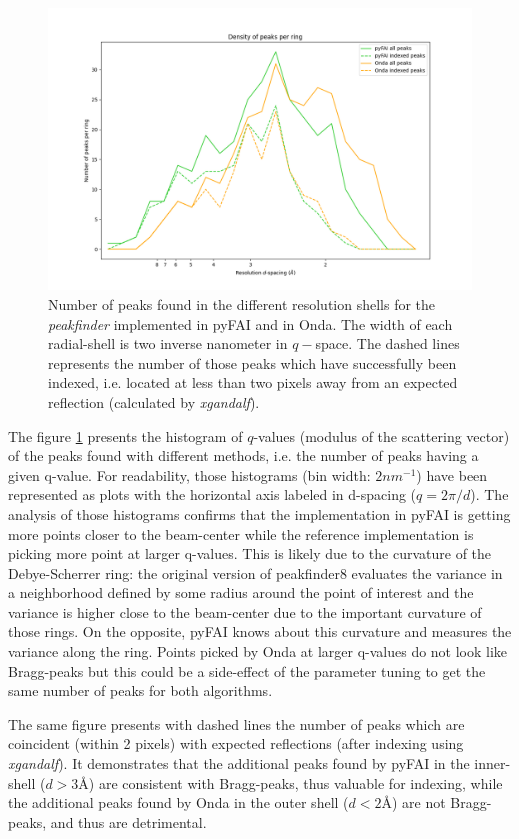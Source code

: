 \documentclass[preprint]{iucr}              %
\begin{document}
\begin{figure}
\label{peak_per_ring}
\includegraphics[width=12cm]{peak_per_ring}
\caption{Number of peaks found in the different resolution shells for the \textit{peakfinder} implemented in pyFAI and in Onda. 
The width of each radial-shell is two inverse nanometer in $q-$space. 
The dashed lines represents the number of those peaks which have successfully been indexed, i.e. located at less than two pixels away from an expected reflection (calculated by \textit{xgandalf}). }
\end{figure}

The figure \ref{peak_per_ring} presents the histogram of $q$-values (modulus of the scattering vector) of the peaks found with different methods, i.e. the number of peaks having a given q-value.
For readability, those histograms (bin width: $2 nm^{-1}$) have been represented as plots with the horizontal axis labeled in d-spacing ($q=2\pi/d$).  
The analysis of those histograms confirms that the implementation in pyFAI is getting more points closer to the beam-center while the reference implementation is picking more point at larger q-values.
This is likely due to the curvature of the Debye-Scherrer ring: the original version of peakfinder8 evaluates the variance in a neighborhood defined by some radius around the point of interest and the variance is higher close to the beam-center due to the important curvature of those rings.
On the opposite, pyFAI knows about this curvature and measures the variance along the ring.
Points picked by Onda at larger q-values do not look like Bragg-peaks but this could be a side-effect of the parameter tuning to get the same number of peaks for both algorithms.

The same figure presents with dashed lines the number of peaks which are coincident (within 2 pixels) with expected reflections (after indexing using \textit{xgandalf}).
It demonstrates that the additional peaks found by pyFAI in the inner-shell ($d>3$\AA{}) are consistent with Bragg-peaks, thus valuable for indexing, while the additional peaks found by Onda in the outer shell ($d<2$\AA) are not Bragg-peaks, and thus are detrimental.
\end{document}
